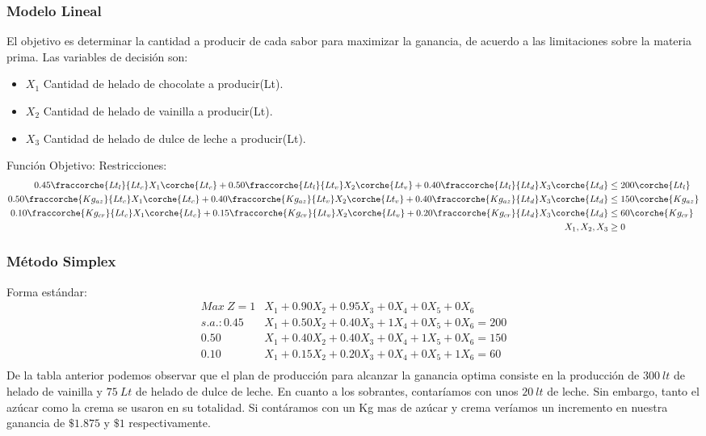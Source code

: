 
\begin{homeworkProblem}[-1][Heladería]

\subsubsection{Modelo Lineal}
El objetivo es determinar la cantidad a producir de cada sabor para maximizar la ganancia, de acuerdo a las limitaciones sobre la materia prima.
Las variables de decisión son:
\begin{itemize}
  \item $X_1$ Cantidad de helado de chocolate a producir(Lt).
  \item $X_2$ Cantidad de helado de vainilla a producir(Lt).
  \item $X_3$ Cantidad de helado de dulce de leche a producir(Lt).
\end{itemize}
Función Objetivo: 
Restricciones:
\begin{align*}
    0.45\fraccorche{Lt_l}{Lt_c}X_1\corche{Lt_c} + 0.50\fraccorche{Lt_l}{Lt_v}X_2\corche{Lt_v} + 0.40\fraccorche{Lt_l}{Lt_d}X_3\corche{Lt_d} &\le 200\corche{Lt_l} \\
    0.50\fraccorche{Kg_{az}}{Lt_c}X_1\corche{Lt_c} + 0.40\fraccorche{Kg_{az}}{Lt_v}X_2\corche{Lt_v} + 0.40\fraccorche{Kg_{az}}{Lt_d}X_3\corche{Lt_d} &\le 150\corche{Kg_{az}} \\
    0.10\fraccorche{Kg_{cr}}{Lt_c}X_1\corche{Lt_c} + 0.15\fraccorche{Kg_{cr}}{Lt_v}X_2\corche{Lt_v} + 0.20\fraccorche{Kg_{cr}}{Lt_d}X_3\corche{Lt_d} &\le 60\corche{Kg_{cr}} \\
    X_1,X_2,X_3 &\ge 0
\end{align*}

\subsubsection{Método Simplex}
Forma estándar:
\begin{align*}
    Max\ Z = 1&X_1 + 0.90X_2 + 0.95X_3 + 0X_4 + 0X_5 +0X_6 \\
    s.a.: 0.45&X_1 + 0.50X_2 + 0.40X_3 + 1X_4 + 0X_5 + 0X_6 = 200 \\
    0.50&X_1 + 0.40X_2 + 0.40X_3 + 0X_4 + 1X_5 + 0X_6 = 150 \\
    0.10&X_1 + 0.15X_2 + 0.20X_3 + 0X_4 + 0X_5 + 1X_6 = 60\\
\end{align*}
De la tabla anterior podemos observar que el plan de producción para alcanzar la ganancia optima consiste en la producción de $300\ lt$ de helado de vainilla y $75\ Lt$ de helado de dulce de leche. En cuanto a los sobrantes, contaríamos con unos $20\ lt$ de leche. Sin embargo, tanto el azúcar como la crema se usaron en su totalidad. Si contáramos con un Kg mas de azúcar y crema veríamos un incremento en nuestra ganancia de $\$1.875$ y $\$1$ respectivamente.


\end{homeworkProblem}
